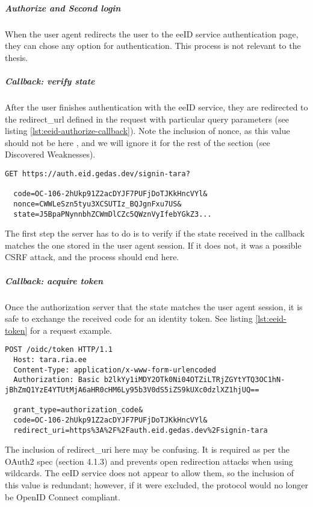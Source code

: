 \subparagraph{Authorize and Second login}

When the user agent redirects the user to the eeID service authentication page, they can chose any option for authentication. This process is not relevant to the thesis.

\subparagraph{Callback: verify state}

After the user finishes authentication with the eeID service, they are redirected to the redirect\_url defined in the request with particular query parameters (see listing \ref{lst:eeid-authorize-callback}). Note the inclusion of nonce, as this value should not be here \cite{okta-oidc-spec}, and we will ignore it for the rest of the section (see Discovered Weaknesses).

\begin{lstlisting}[caption={The eeID service authorize redirect response}, label={lst:eeid-authorize-callback}]
  GET https://auth.eid.gedas.dev/signin-tara?
  
  code=OC-106-2hUkp91Z2acDYJF7PUFjDoTJKkHncVYl&
  nonce=CWWLeSzn5tyu3XCSUTIz_BQJgnFxu7US&
  state=J5BpaPNynnbhZCWmDlCZc5QWznVyIfebYGkZ3...
\end{lstlisting}

The first step the server has to do is to verify if the state received in the callback matches the one stored in the user agent session. If it does not, it was a possible CSRF attack, and the process should end here.

\subparagraph{Callback: acquire token}

Once the authorization server that the state matches the user agent session, it is safe to exchange the received code for an identity token. See listing \ref{lst:eeid-token} for a request example.

\begin{lstlisting}[caption={The eeID service token request}, label={lst:eeid-token}]
  POST /oidc/token HTTP/1.1
  Host: tara.ria.ee
  Content-Type: application/x-www-form-urlencoded
  Authorization: Basic b2lkYy1iMDY2OTk0Ni04OTZiLTRjZGYtYTQ3OC1hN-jBhZmQ1YzE4YTUtMjA6aHR0cHM6Ly95b3V0dS5iZS9kUXc0dzlXZ1hjUQ==

  grant_type=authorization_code&
  code=OC-106-2hUkp91Z2acDYJF7PUFjDoTJKkHncVYl&
  redirect_uri=https%3A%2F%2Fauth.eid.gedas.dev%2Fsignin-tara
\end{lstlisting}

The inclusion of redirect\_uri here may be confusing. It is required as per the OAuth2 spec (section 4.1.3) \cite{rfc6749} and prevents open redirection attacks when using wildcards. The eeID service does not appear to allow them, so the inclusion of this value is redundant; however, if it were excluded, the protocol would no longer be OpenID Connect compliant.

